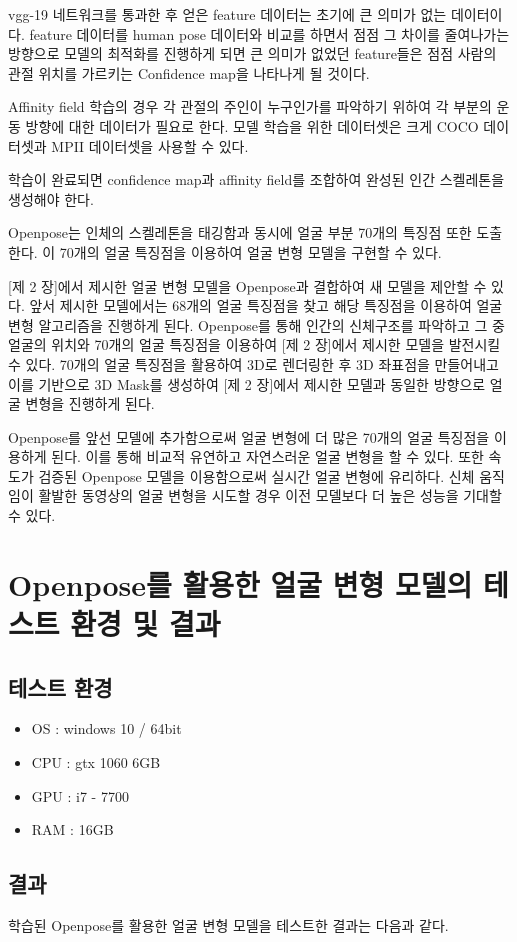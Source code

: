 \documentclass{oblivoir}
\newcommand{\spec}{
    \begin{itemize}
        \item OS : windows 10 / 64bit
        \item CPU : gtx 1060 6GB
        \item GPU : i7 - 7700
        \item RAM : 16GB
    \end{itemize}
    }
\begin{document}
vgg-19 네트워크를 통과한 후 얻은 feature 데이터는 초기에 큰 의미가 없는 데이터이다. feature 데이터를 human pose 데이터와 비교를 하면서 점점 그 차이를 줄여나가는 방향으로 모델의 최적화를 진행하게 되면 큰 의미가 없었던 feature들은 점점 사람의 관절 위치를 가르키는 Confidence map을 나타나게 될 것이다.

Affinity field 학습의 경우 각 관절의 주인이 누구인가를 파악하기 위하여 각 부분의 운동 방향에 대한 데이터가 필요로 한다. 모델 학습을 위한 데이터셋은 크게 COCO 데이터셋과 MPII 데이터셋을 사용할 수 있다.

학습이 완료되면 confidence map과 affinity field를 조합하여 완성된 인간 스켈레톤을 생성해야 한다.

Openpose는 인체의 스켈레톤을 태깅함과 동시에 얼굴 부분 70개의 특징점 또한 도출 한다. 이 70개의 얼굴 특징점을 이용하여 얼굴 변형 모델을 구현할 수 있다.

[제 2 장]에서 제시한 얼굴 변형 모델을 Openpose과 결합하여 새 모델을 제안할 수 있다. 앞서 제시한 모델에서는 68개의 얼굴 특징점을 찾고 해당 특징점을 이용하여 얼굴 변형 알고리즘을 진행하게 된다. Openpose를 통해 인간의 신체구조를 파악하고 그 중 얼굴의 위치와 70개의 얼굴 특징점을 이용하여 [제 2 장]에서 제시한 모델을 발전시킬 수 있다. 70개의 얼굴 특징점을 활용하여 3D로 렌더링한 후 3D 좌표점을 만들어내고 이를 기반으로 3D Mask를 생성하여 [제 2 장]에서 제시한 모델과 동일한 방향으로 얼굴 변형을 진행하게 된다.

Openpose를 앞선 모델에 추가함으로써 얼굴 변형에 더 많은 70개의 얼굴 특징점을 이용하게 된다. 이를 통해 비교적 유연하고 자연스러운 얼굴 변형을 할 수 있다. 또한 속도가 검증된 Openpose 모델을 이용함으로써 실시간 얼굴 변형에 유리하다. 신체 움직임이 활발한 동영상의 얼굴 변형을 시도할 경우 이전 모델보다 더 높은 성능을 기대할 수 있다.

\section{Openpose를 활용한 얼굴 변형 모델의 테스트 환경 및 결과}

\subsection{테스트 환경}
\spec
\subsection{ 결과 }

학습된 Openpose를 활용한 얼굴 변형 모델을 테스트한 결과는 다음과 같다.
\end{document}

